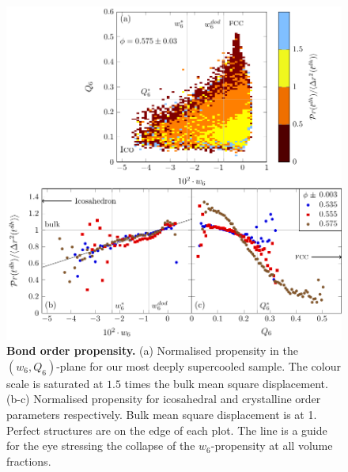 \begin{figure}
\begin{center}
\includegraphics{generate_figures-figure3.pdf}
\end{center}
\caption{{\bf Bond order propensity.} (a) Normalised propensity in the $(w_6, Q_6)$-plane for our most deeply supercooled sample. The colour scale is saturated at $1.5$ times the bulk mean square displacement. (b-c) Normalised propensity for icosahedral and crystalline order parameters respectively. Bulk mean square displacement is at 1. Perfect structures are on the edge of each plot. The line is a guide for the eye stressing the collapse of the $w_6$-propensity at all volume fractions.}
	\label{fig:msd_Q6_w6}
\end{figure}

\clearpage

